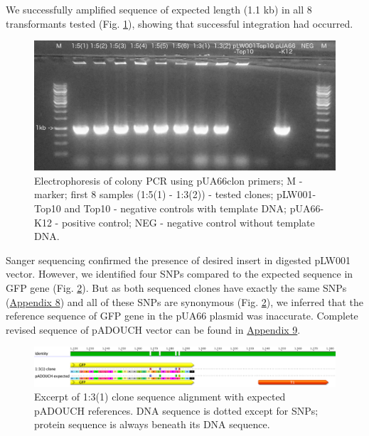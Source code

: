 We successfully amplified sequence of expected length (1.1 kb) in all 8 transformants tested (Fig. \ref{colonyPCR}), showing that successful integration had occurred.
\begin{figure}[h!]
  \centering
  \includegraphics[scale=0.2]{text/Pictures/ColonyPCR.jpg}
	\caption{Electrophoresis of colony PCR using pUA66\textunderscore clon primers; M - marker; first 8 samples (1:5(1) - 1:3(2)) - tested clones; pLW001-Top10 and Top10 - negative controls with template DNA; pUA66-K12 - positive control; NEG - negative control without template DNA.}
	\label{colonyPCR}
\end{figure}
Sanger sequencing confirmed the presence of desired insert in digested pLW001 vector.
However, we identified four SNPs compared to the expected sequence in GFP gene (Fig. \ref{1:3(1)seq}).
But as both sequenced clones have exactly the same SNPs (\hyperlink{pADOUCHseq}{Appendix 8}) and all of these SNPs are synonymous (Fig. \ref{1:3(1)seq}), we inferred that the reference sequence of GFP gene in the pUA66 plasmid was inaccurate.
Complete revised sequence of pADOUCH vector can be found in \hyperlink{pADOUCHwhole}{Appendix 9}.
\begin{figure}[ht!]
  \centering
  \includegraphics[scale=0.26]{text/Pictures/pADOUCHseq.png}
	\caption{Excerpt of 1:3(1) clone sequence alignment with expected pADOUCH references. DNA sequence is dotted except for SNPs; protein sequence is always beneath its DNA sequence.}
	\label{1:3(1)seq}
\end{figure}

\cleardoublepage%

\shorthandon{-} 


